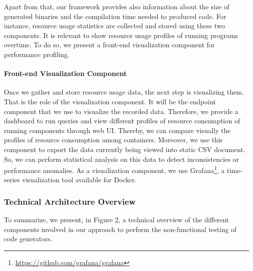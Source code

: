 Apart from that, our framework provides also information about the size of generated binaries and the compilation time needed to produced code.
For instance, resource usage statistics are collected and stored using these two components. It is relevant to show resource usage profiles of running programs overtime. To do so, we present a front-end visualization component for performance profiling. 

\paragraph{Front-end Visualization Component}
Once we gather and store resource usage data, the next step is visualizing them. That is the role of the visualization component. It will be the endpoint component that we use to visualize the recorded data. Therefore, we provide a dashboard to run queries and view different profiles of resource consumption of running components through web UI. Thereby, we can compare visually the profiles of resource consumption among containers. Moreover, we use this component to export the data currently being viewed into static CSV document. So, we can perform statistical analysis on this data to detect inconsistencies or performance anomalies.
As a visualization component, we use Grafana\footnote{\url{https://github.com/grafana/grafana}}, a time-series visualization tool available for Docker. 

\subsubsection{Technical Architecture Overview}
To summarize, we present, in Figure 2, a technical overview of the different components involved in our approach to perform the non-functional testing of code generators.

